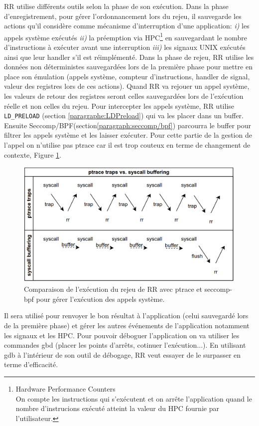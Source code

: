 RR utilise différents outils selon la phase de son
exécution\citep{RRimplem}. Dans la phase d'enregistrement, pour gérer
l'ordonnancement lors du rejeu, il sauvegarde les actions qu'il considère comme
mécanisme d'interruption d'une application: \textit{i)} les appels système
exécutés \textit{ii)} la préemption via HPC\footnote{Hardware Performance
  Counters \\ On compte les instructions qui s'exécutent et on arrête
  l'application quand le nombre d'instrucions exécuté atteint la valeur du HPC
  fournie par l'utilisateur.} en sauvegardant le nombre d'instructions à exécuter
avant une interruption \textit{iii)} les signaux UNIX exécutés ainsi que leur
handler s'il est réimplémenté. Dans la phase de rejeu, RR utilise les données
non déterministes sauvegardées lors de la première phase pour mettre en place
son émulation (appels système, compteur d'instructions, handler de signal,
valeur des registres lors de ces actions). Quand RR va rejouer un appel système,
les valeurs de retour des registres seront celles sauvegardées lors de
l'exécution réelle et non celles du rejeu. Pour intercepter les appels système,
RR utilise \texttt{LD\_PRELOAD} (section \ref{paragraphe:LDPreload}) qui va les
placer dans un buffer. Ensuite Seccomp/BPF(section\ref{paragraph:seccomp/bpf})
parcourra le buffer pour filtrer les appels système et les laisser
exécuter. Pour cette partie de la gestion de l'appel on n'utilise pas ptrace car
il est trop couteux en terme de changement de contexte, Figure \ref{AS_RR}.
\begin{figure}
\centering \includegraphics[scale=0.30]{Pictures/png/RR_AS}
\caption{Comparaison de l'exécution du rejeu de RR avec ptrace et seccomp-bpf
  pour gérer l'exécution des appels système.}
\label{AS_RR}
\end{figure}
Il sera utilisé pour renvoyer le bon résultat à l'application (celui sauvegardé
lors de la première phase) et gérer les autres événements de l'application
notamment les signaux et les HPC. Pour pouvoir déboguer l'application on va
utiliser les commandes gbd (placer les points d'arrêts, cotinuer
l'exécution...). En utilisant gdb à l'intérieur de son outil de débogage, RR
veut essayer de le surpasser en terme d'efficacité.

